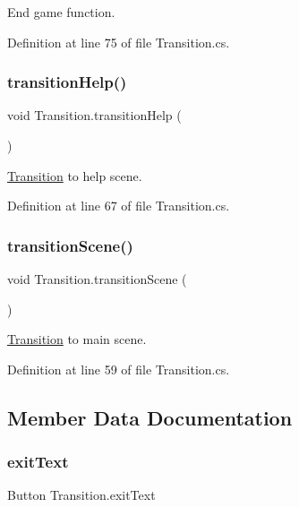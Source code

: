 End game function. 

Definition at line 75 of file Transition.\+cs.

\hypertarget{class_transition_a77fc2840187cd5d6b28430e307ccbe1e}{}\label{class_transition_a77fc2840187cd5d6b28430e307ccbe1e} 
\subsubsection{\texorpdfstring{transition\+Help()}{transitionHelp()}}
{\footnotesize\ttfamily void Transition.\+transition\+Help (\begin{DoxyParamCaption}{ }\end{DoxyParamCaption})}

\hyperlink{class_transition}{Transition} to help scene. 

Definition at line 67 of file Transition.\+cs.

\hypertarget{class_transition_a6d5791afbbe63424104a41705c2aadfc}{}\label{class_transition_a6d5791afbbe63424104a41705c2aadfc} 
\subsubsection{\texorpdfstring{transition\+Scene()}{transitionScene()}}
{\footnotesize\ttfamily void Transition.\+transition\+Scene (\begin{DoxyParamCaption}{ }\end{DoxyParamCaption})}

\hyperlink{class_transition}{Transition} to main scene. 

Definition at line 59 of file Transition.\+cs.



\subsection{Member Data Documentation}
\hypertarget{class_transition_adb5a3c819a57321e4e06e92cb17fdf02}{}\label{class_transition_adb5a3c819a57321e4e06e92cb17fdf02} 
\subsubsection{\texorpdfstring{exit\+Text}{exitText}}
{\footnotesize\ttfamily Button Transition.\+exit\+Text}



